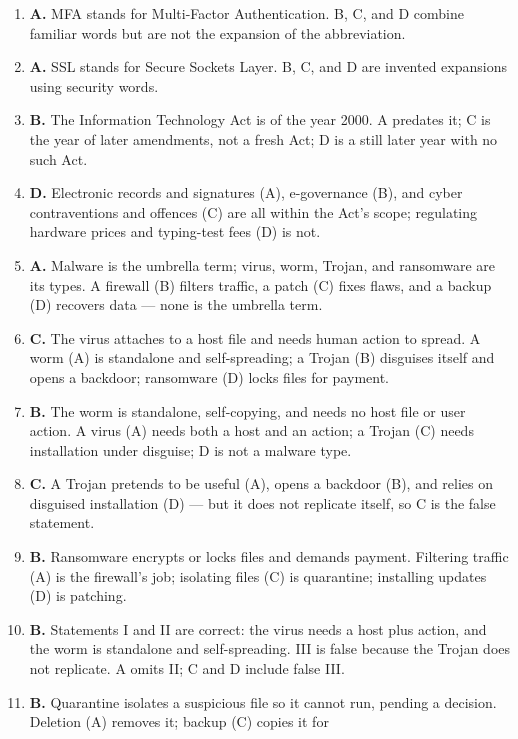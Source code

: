 \begin{enumerate}[label=\textbf{Q\arabic*.}, leftmargin=*]
\item \textbf{A.} MFA stands for Multi-Factor Authentication. B, C, and D
  combine familiar words but are not the expansion of the abbreviation.
\item \textbf{A.} SSL stands for Secure Sockets Layer. B, C, and D are
  invented expansions using security words.
\item \textbf{B.} The Information Technology Act is of the year 2000. A
  predates it; C is the year of later amendments, not a fresh Act; D is a
  still later year with no such Act.
\item \textbf{D.} Electronic records and signatures (A), e-governance (B),
  and cyber contraventions and offences (C) are all within the Act's scope;
  regulating hardware prices and typing-test fees (D) is not.
\item \textbf{A.} Malware is the umbrella term; virus, worm, Trojan, and
  ransomware are its types. A firewall (B) filters traffic, a patch (C)
  fixes flaws, and a backup (D) recovers data --- none is the umbrella term.
\item \textbf{C.} The virus attaches to a host file and needs human action
  to spread. A worm (A) is standalone and self-spreading; a Trojan (B)
  disguises itself and opens a backdoor; ransomware (D) locks files for
  payment.
\item \textbf{B.} The worm is standalone, self-copying, and needs no host
  file or user action. A virus (A) needs both a host and an action; a
  Trojan (C) needs installation under disguise; D is not a malware type.
\item \textbf{C.} A Trojan pretends to be useful (A), opens a backdoor
  (B), and relies on disguised installation (D) --- but it does not
  replicate itself, so C is the false statement.
\item \textbf{B.} Ransomware encrypts or locks files and demands payment.
  Filtering traffic (A) is the firewall's job; isolating files (C) is
  quarantine; installing updates (D) is patching.
\item \textbf{B.} Statements I and II are correct: the virus needs a host
  plus action, and the worm is standalone and self-spreading. III is false
  because the Trojan does not replicate. A omits II; C and D include false
  III.
\item \textbf{B.} Quarantine isolates a suspicious file so it cannot run,
  pending a decision. Deletion (A) removes it; backup (C) copies it for

\end{enumerate}
